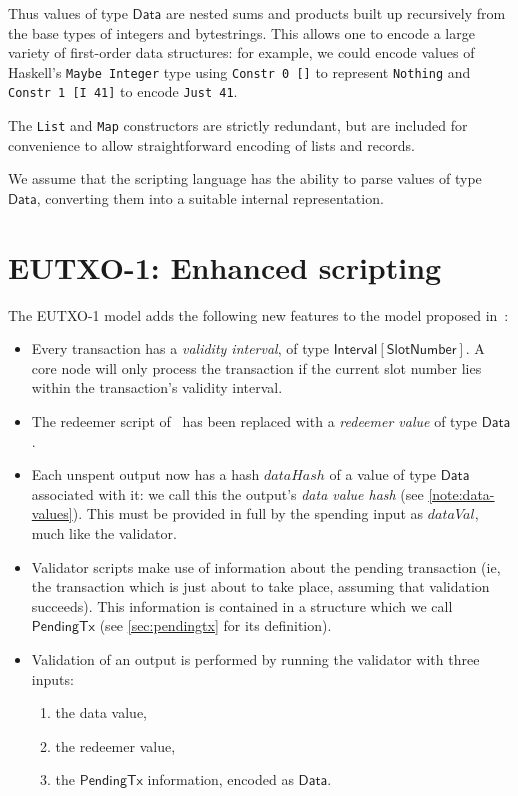 \documentclass[a4paper]{article}
\newcounter{note}
\newcommand{\s}{\textsf}  %
\newcommand{\mi}[1]{\ensuremath{\mathit{#1}}}
\newcommand{\Interval}[1]{\ensuremath{\s{Interval}[#1]}}
\newcommand{\ptx}{\ensuremath{\s{PendingTx}}}
\newcommand{\dataVal}{\mi{dataVal}}
\newcommand{\dataHash}{\mi{dataHash}}
\newcommand{\Data}{\ensuremath{\s{Data}}}
\newcommand{\slotnum}{\ensuremath{\s{SlotNumber}}}
\begin{document}
\noindent Thus values of type \Data{} are nested sums and products
built up recursively from the base types of integers and
bytestrings. This allows one to encode a large variety of first-order
data structures: for example, we could encode values of Haskell's
\verb|Maybe Integer| type using \verb|Constr 0 []| to represent
\verb|Nothing| and \verb|Constr 1 [I 41]| to encode \verb|Just 41|.


The \texttt{List} and \texttt{Map} constructors are strictly
redundant, but are included for convenience to allow straightforward
encoding of lists and records.

We assume that the scripting language has the ability to parse values
of type \Data{}, converting them into a suitable internal representation.


\section{EUTXO-1: Enhanced scripting}
\label{sec:eutxo-1}
The EUTXO-1 model adds the following new features to the model
proposed in~\citep{Zahnentferner18-UTxO}:

\begin{itemize}
\item Every transaction has a \textit{validity interval}, of type $\Interval{\slotnum}$.
  A core node will only process the transaction if
  the current slot number lies within the transaction's validity
  interval.

\item The redeemer script of~\citet{Zahnentferner18-UTxO} has been
  replaced with a \textit{redeemer value} of type \Data{}.

\item Each unspent output now has a hash $\dataHash$ of a value of
  type \Data{} associated with it: we call this the output's
  \textit{data value hash} (see \cref{note:data-values}). This must be
  provided in full by the spending input as $\dataVal$, much like the
  validator.

\item Validator scripts make use of information about the pending
  transaction (ie, the transaction which is just about to take place, assuming that
  validation succeeds). This information is contained in a structure
  which we call \ptx{} (see \cref{sec:pendingtx} for its definition).

\item Validation of an output is performed by running the validator
  with three inputs:
  \begin{enumerate}
  \item the data value,
  \item the redeemer value,
  \item the \ptx{} information, encoded as \Data{}.
  \end{enumerate}

\end{itemize}
\end{document}
